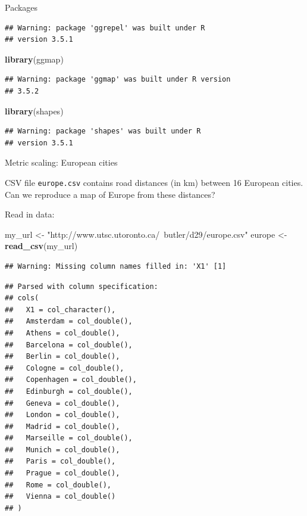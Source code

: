 \documentclass[ignorenonframetext,]{beamer}
\newenvironment{Shaded}{\begin{snugshade}}{\end{snugshade}}
\newcommand{\KeywordTok}[1]{\textcolor[rgb]{0.13,0.29,0.53}{\textbf{#1}}}
\newcommand{\NormalTok}[1]{#1}
\newcommand{\StringTok}[1]{\textcolor[rgb]{0.31,0.60,0.02}{#1}}
\begin{document}
\begin{frame}[fragile]{Packages}
\begin{verbatim}
## Warning: package 'ggrepel' was built under R
## version 3.5.1
\end{verbatim}

\begin{Shaded}
\begin{Highlighting}[]
\KeywordTok{library}\NormalTok{(ggmap)}
\end{Highlighting}
\end{Shaded}

\begin{verbatim}
## Warning: package 'ggmap' was built under R version
## 3.5.2
\end{verbatim}

\begin{Shaded}
\begin{Highlighting}[]
\KeywordTok{library}\NormalTok{(shapes)}
\end{Highlighting}
\end{Shaded}

\begin{verbatim}
## Warning: package 'shapes' was built under R
## version 3.5.1
\end{verbatim}

\end{frame}

\begin{frame}[fragile]{Metric scaling: European cities}
\protect\hypertarget{metric-scaling-european-cities}{}

CSV file \texttt{europe.csv} contains road distances (in km) between 16
European cities. Can we reproduce a map of Europe from these distances?

Read in data:

\begin{Shaded}
\begin{Highlighting}[]
\NormalTok{my_url <-}\StringTok{ "http://www.utsc.utoronto.ca/~butler/d29/europe.csv"}
\NormalTok{europe <-}\StringTok{ }\KeywordTok{read_csv}\NormalTok{(my_url)}
\end{Highlighting}
\end{Shaded}

\begin{verbatim}
## Warning: Missing column names filled in: 'X1' [1]
\end{verbatim}

\begin{verbatim}
## Parsed with column specification:
## cols(
##   X1 = col_character(),
##   Amsterdam = col_double(),
##   Athens = col_double(),
##   Barcelona = col_double(),
##   Berlin = col_double(),
##   Cologne = col_double(),
##   Copenhagen = col_double(),
##   Edinburgh = col_double(),
##   Geneva = col_double(),
##   London = col_double(),
##   Madrid = col_double(),
##   Marseille = col_double(),
##   Munich = col_double(),
##   Paris = col_double(),
##   Prague = col_double(),
##   Rome = col_double(),
##   Vienna = col_double()
## )
\end{verbatim}

\end{frame}
\end{document}
